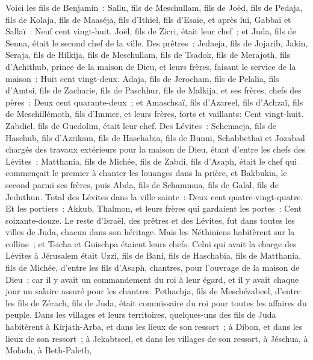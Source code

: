 \begin{multicols}{2}
Voici les fils de Benjamin~: Sallu, fils de Meschullam, fils de Joëd, fils de Pedaja, fils de Kolaja, fils de Maaséja, fils d'Ithiel, fils d'Esaïe,
et après lui, Gabbaï et Sallaï~: Neuf cent vingt-huit.
Joël, fils de Zicri, était leur chef~; et Juda, fils de Senua, était le second chef de la ville.
Des prêtres~: Jedaeja, fils de Jojarib, Jakin,
Seraja, fils de Hilkija, fils de Meschullam, fils de Tsadok, fils de Merajoth, fils d'Achithub, prince de la maison de Dieu,
et leurs frères, faisant le service de la maison~: Huit cent vingt-deux. Adaja, fils de Jerocham, fils de Pelalia, fils d'Amtsi, fils de Zacharie, fils de Paschhur, fils de Malkija,
et ses frères, chefs des pères~: Deux cent quarante-deux~; et Amaschsaï, fils d'Azareel, fils d'Achzaï, fils de Meschillémoth, fils d'Immer,
et leurs frères, forts et vaillants: Cent vingt-huit. Zabdiel, fils de Guedolim, était leur chef.
Des Lévites~: Schemaeja, fils de Haschub, fils d'Azrikam, fils de Haschabia, fils de Bunni,
Schabbethaï et Jozabad chargés des travaux extérieurs pour la maison de Dieu, étant d'entre les chefs des Lévites~;
Matthania, fils de Michée, fils de Zabdi, fils d'Asaph, était le chef qui commençait le premier à chanter les louanges dans la prière, et Bakbukia, le second parmi ses frères, puis Abda, fils de Schammua, fils de Galal, fils de Jeduthun.
Total des Lévites dans la ville sainte~: Deux cent quatre-vingt-quatre.
Et les portiers~: Akkub, Thalmon, et leurs frères qui gardaient les portes~: Cent soixante-douze.
Le reste d'Israël, des prêtres et des Lévites, fut dans toutes les villes de Juda, chacun dans son héritage.
Mais les Néthiniens habitèrent sur la colline~; et Tsicha et Guischpa étaient leurs chefs.
Celui qui avait la charge des Lévites à Jérusalem était Uzzi, fils de Bani, fils de Haschabia, fils de Matthania, fils de Michée, d'entre les fils d'Asaph, chantres, pour l'ouvrage de la maison de Dieu~;
car il y avait un commandement du roi à leur égard, et il y avait chaque jour un salaire assuré pour les chantres.
Pethachja, fils de Meschézabeel, d'entre les fils de Zérach, fils de Juda, était commissaire du roi pour toutes les affaires du peuple.
Dans les villages et leurs territoires, quelques-uns des fils de Juda habitèrent à Kirjath-Arba, et dans les lieux de son ressort~; à Dibon, et dans les lieux de son ressort~; à Jekabtseel, et dans les villages de son ressort,
à Jéschua, à Molada, à Beth-Paleth,

\end{multicols}
